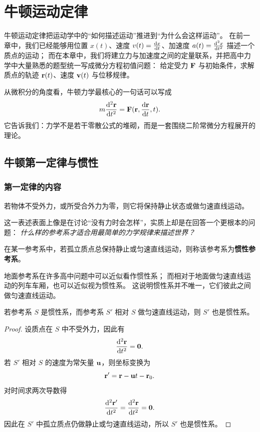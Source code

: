 \chapter{牛顿运动定律}

牛顿运动定律把运动学中的“如何描述运动”推进到“为什么会这样运动”。
在前一章中，我们已经能够用位置 $x(t)$、速度 $v(t)=\dv{x}{t}$、加速度 $a(t)=\dv[2]{x}{t}$ 描述一个质点的运动；
而在本章中，我们将建立力与加速度之间的定量联系，并把高中力学中大量熟悉的题型统一写成微分方程初值问题：
给定受力 $\vb{F}$ 与初始条件，求解质点的轨迹 $\vb{r}(t)$、速度 $\vb{v}(t)$ 与位移规律。

从微积分的角度看，牛顿力学最核心的一句话可以写成
\[
  m\dv[2]{\vb{r}}{t}=\vb{F}(\vb{r},\dv{\vb{r}}{t},t).
\]
它告诉我们：力学不是若干零散公式的堆砌，而是一套围绕二阶常微分方程展开的理论。

\section{牛顿第一定律与惯性}
\subsection{第一定律的内容}

\begin{law}[牛顿第一定律]
若物体不受外力，或所受合外力为零，则它将保持静止状态或做匀速直线运动。
\end{law}

这一表述表面上像是在讨论“没有力时会怎样”，实质上却是在回答一个更根本的问题：
\emph{什么样的参考系才适合用最简单的力学规律来描述世界？}

\begin{definition}[惯性参考系]
在某一参考系中，若孤立质点总保持静止或匀速直线运动，则称该参考系为\textbf{惯性参考系}。
\end{definition}

地面参考系在许多高中问题中可以近似看作惯性系；
而相对于地面做匀速直线运动的列车车厢，也可以近似视为惯性系。
这说明惯性系并不唯一，它们彼此之间做匀速直线运动。

\begin{theorem}[惯性系之间的相对运动]
若参考系 $S$ 是惯性系，而参考系 $S'$ 相对 $S$ 做匀速直线运动，则 $S'$ 也是惯性系。
\end{theorem}

\begin{proof}
设质点在 $S$ 中不受外力，因此有
\[
  \dv[2]{\vb{r}}{t}=\vb{0}.
\]
若 $S'$ 相对 $S$ 的速度为常矢量 $\vb{u}$，则坐标变换为
\[
  \vb{r}'=\vb{r}-\vb{u}t-\vb{r}_0.
\]
对时间求两次导数得
\[
  \dv[2]{\vb{r}'}{t}=\dv[2]{\vb{r}}{t}=\vb{0}.
\]
因此在 $S'$ 中孤立质点仍做静止或匀速直线运动，所以 $S'$ 也是惯性系。
\end{proof}

